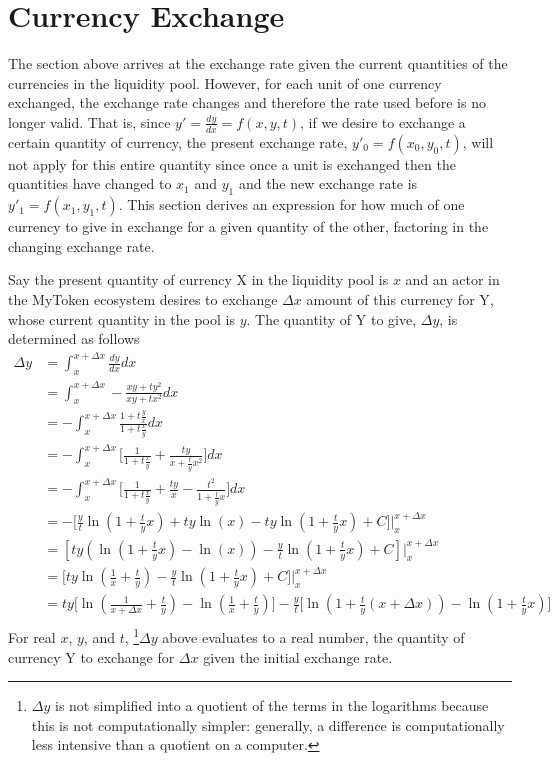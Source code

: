 \documentclass{article}
\begin{document}
\section{Currency Exchange}
The section above arrives at the exchange rate given the current quantities of the currencies in the liquidity pool. However, for each unit of one currency exchanged, the exchange rate changes and therefore the rate used before is no longer valid. That is, since $y' = \frac{dy}{dx} = f(x,y,t)$, if we desire to exchange a certain quantity of currency, the present exchange rate, $y'_0 = f(x_0,y_0,t)$, will not apply for this entire quantity since once a unit is exchanged then the quantities have changed to $x_1$ and $y_1$ and the new exchange rate is $y'_1 = f(x_1,y_1,t)$. This section derives an expression for how much of one currency to give in exchange for a given quantity of the other, factoring in the changing exchange rate.

\noindent Say the present quantity of currency X in the liquidity pool is $x$ and an actor in the MyToken ecosystem desires to exchange $\Delta x$ amount of this currency for Y, whose current quantity in the pool is $y$. The quantity of Y to give, $\Delta y$, is determined as follows
\begin{align*}
    \Delta y &= \int_{x}^{x+\Delta x} \frac{dy}{dx} dx   \\
    &= \int_{x}^{x+\Delta x} - \frac{xy+ty^2}{xy+tx^2} dx     \\
    &= - \int_{x}^{x+\Delta x} \frac{1+t\frac{y}{x}}{1+t\frac{x}{y}} dx     \\
    &= - \int_{x}^{x+\Delta x} \Bigg[ \frac{1}{1+t\frac{x}{y}} + \frac{ty}{x+\frac{t}{y}x^2} \Bigg] dx    \\
    &= - \int_{x}^{x+\Delta x} \Bigg[ \frac{1}{1+t\frac{x}{y}} + \frac{ty}{x} - \frac{t^2}{1+\frac{t}{y}x} \Bigg] dx    \\
    &= - \Bigg[ \frac{y}{t} \ln\left( 1+\frac{t}{y}x \right) + ty \ln(x) - ty \ln\left( 1+\frac{t}{y}x \right) + C \Bigg] \Bigg|_{x}^{x+\Delta x}  \\
    &= \left[ ty \left( \ln\left( 1+\frac{t}{y}x \right) -\ln(x) \right) - \frac{y}{t} \ln\left( 1+\frac{t}{y}x \right) + C \right] \Bigg|_{x}^{x+\Delta x}  \\
    &= \Bigg[ ty \ln\left( \frac{1}{x} +\frac{t}{y} \right) - \frac{y}{t} \ln\left( 1+\frac{t}{y}x \right) + C \Bigg] \Bigg|_{x}^{x+\Delta x}     \\
    &= ty \Bigg[ \ln\left( \frac{1}{x+\Delta x}+\frac{t}{y} \right) - \ln\left( \frac{1}{x}+\frac{t}{y} \right) \Bigg] - \frac{y}{t} \Bigg[ \ln\left( 1+\frac{t}{y}(x+\Delta x)\right) - \ln\left( 1+\frac{t}{y}x \right) \Bigg]    \\
\end{align*}
\noindent For real $x$, $y$, and $t$, \footnote{$\Delta y$ is not simplified into a quotient of the terms in the logarithms because this is not computationally simpler: generally, a difference is computationally less intensive than a quotient on a computer.}$\Delta y$ above evaluates to a real number, the quantity of currency Y to exchange for $\Delta x$ given the initial exchange rate.
\end{document}
